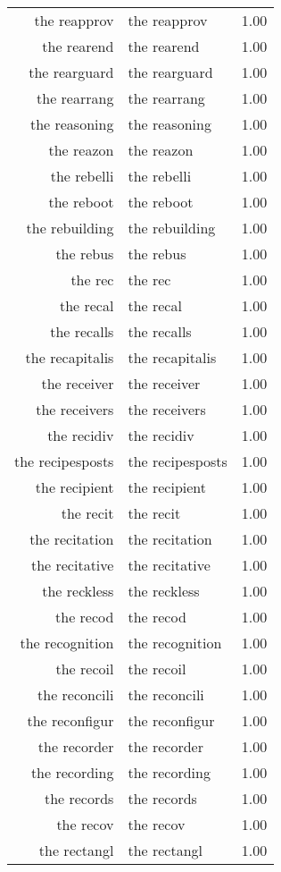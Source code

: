 \begin{table}[ht]
\begin{tabular}{rlr}
  the reapprov & the reapprov & 1.00 \\ 
  the rearend & the rearend & 1.00 \\ 
  the rearguard & the rearguard & 1.00 \\ 
  the rearrang & the rearrang & 1.00 \\ 
  the reasoning & the reasoning & 1.00 \\ 
  the reazon & the reazon & 1.00 \\ 
  the rebelli & the rebelli & 1.00 \\ 
  the reboot & the reboot & 1.00 \\ 
  the rebuilding & the rebuilding & 1.00 \\ 
  the rebus & the rebus & 1.00 \\ 
  the rec & the rec & 1.00 \\ 
  the recal & the recal & 1.00 \\ 
  the recalls & the recalls & 1.00 \\ 
  the recapitalis & the recapitalis & 1.00 \\ 
  the receiver & the receiver & 1.00 \\ 
  the receivers & the receivers & 1.00 \\ 
  the recidiv & the recidiv & 1.00 \\ 
  the recipesposts & the recipesposts & 1.00 \\ 
  the recipient & the recipient & 1.00 \\ 
  the recit & the recit & 1.00 \\ 
  the recitation & the recitation & 1.00 \\ 
  the recitative & the recitative & 1.00 \\ 
  the reckless & the reckless & 1.00 \\ 
  the recod & the recod & 1.00 \\ 
  the recognition & the recognition & 1.00 \\ 
  the recoil & the recoil & 1.00 \\ 
  the reconcili & the reconcili & 1.00 \\ 
  the reconfigur & the reconfigur & 1.00 \\ 
  the recorder & the recorder & 1.00 \\ 
  the recording & the recording & 1.00 \\ 
  the records & the records & 1.00 \\ 
  the recov & the recov & 1.00 \\ 
  the rectangl & the rectangl & 1.00 \\ 

\end{tabular}
\end{table}
